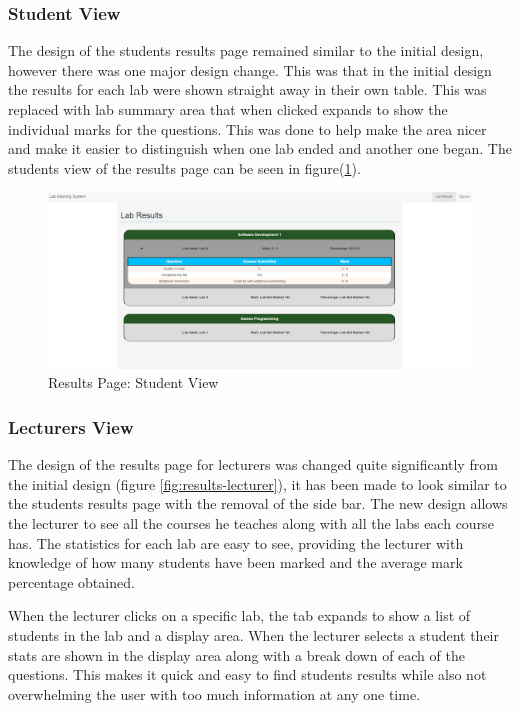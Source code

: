 \documentclass[12pt]{article}  %
\begin{document}
\subsubsection*{Student View}
The design of the students results page remained similar to the initial design, however there was one major design change. This was that in the initial design the results for each lab were shown straight away in their own table. This was replaced with lab summary area that when clicked expands to show the individual marks for the questions. This was done to help make the area nicer and make it easier to distinguish when one lab ended and another one began. The students view of the results page can be seen in figure(\ref{fig:results-student}).


\begin{figure}[H]
    \centering
    \includegraphics[width=1\textwidth]{images/implementation/student-results-page.png}
    \caption{Results Page: Student View}
    \label{fig:results-student}
\end{figure}


\subsubsection*{Lecturers View} \label{sec:results-lecturer}

The design of the results page for lecturers was changed quite significantly from the initial design (figure \ref{fig:results-lecturer}), it has been made to look similar to the students results page with the removal of the side bar. The new design allows the lecturer to see all the courses he teaches along with all the labs each course has. The statistics for each lab are easy to see, providing the lecturer with knowledge of how many students have been marked and the average mark percentage obtained.

When the lecturer clicks on a specific lab, the tab expands to show a list of students in the lab and a display area. When the lecturer selects a student their stats are shown in the display area along with a break down of each of the questions. This makes it quick and easy to find students results while also not overwhelming the user with too much information at any one time.
\end{document}
